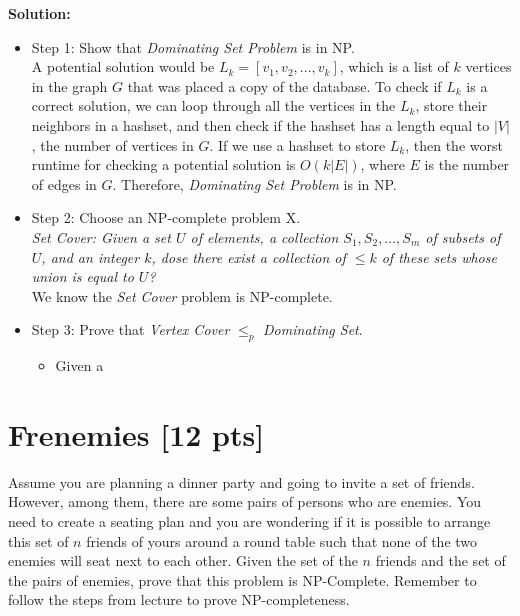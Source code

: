 \documentclass{article}
\begin{document}
\begin{tcolorbox}
{\bf Solution:} 
\begin{itemize}
\item Step 1: Show that  {\em Dominating Set Problem} is in NP.\\
A potential solution would be $L_k = [v_1, v_2, ..., v_k]$, which is a list of $k$ vertices in the graph $G$ that was placed a copy of the database. To check if $L_k$ is a correct solution, we can loop through all the vertices in the $L_k$, store their neighbors in a hashset, and then check if the hashset has a length equal to $|V|$, the number of vertices in $G$. If we use a hashset to store $L_k$, then the worst runtime for checking a potential solution is $O(k|E|)$, where $E$ is the number of edges in $G$. Therefore, {\em Dominating Set Problem} is in NP. 

\item Step 2: Choose an NP-complete problem X.\\
{\em Set Cover: Given a set $U$ of elements, a collection $S_1, S_2, ..., S_m$ of subsets of $U$, and an integer $k$, dose there exist a collection of $\leq k$ of these sets whose union is equal to $U$? }\\ 
We know the {\em Set Cover} problem is NP-complete. 
\end{itemize}
\end{tcolorbox}

\begin{tcolorbox}
\begin{itemize}
\item Step 3: Prove that  {\em Vertex Cover}  $ \leq_{p}$ {\em Dominating Set}.
\begin{itemize}
\item Given a 
\end{itemize}
\end{itemize}
\end{tcolorbox}

\section{Frenemies [12 pts]} 

Assume you are planning a dinner party and going to invite a set of friends. However, among them, there are some pairs of persons who are enemies. You need to create a seating plan and you are wondering if it is possible to arrange this set of $n$ friends of yours around a round table such that none of the two enemies will seat next to each other. Given the set of the $n$ friends and the set of the pairs of enemies, prove that this problem is NP-Complete. Remember to follow the steps from lecture to prove NP-completeness.
\end{document}
